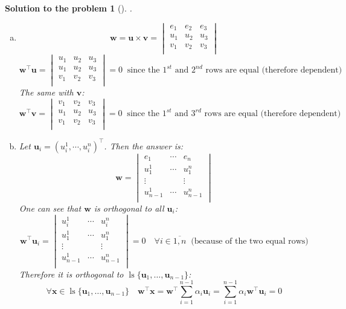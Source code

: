 \documentclass[12pt,a4]{article}
\newtheorem{solution}{Solution to the problem}
\newcommand\ls{\operatorname{ls}}
\newcommand{\ov}{\overline}
\newcommand{\bu}{{\mathbf u}}
\newcommand{\bv}{{\mathbf v}}
\newcommand{\bx}{{\mathbf x}}
\newcommand{\bw}{{\mathbf w}}
\begin{document}
\begin{solution}[]\rm .
\begin{enumerate}[(a)]
\item 
\[
\bw = \bu \times \bv =
\begin{vmatrix}
e_1 & e_2 & e_3 \\
u_1 & u_2 & u_3 \\
v_1 & v_2 & v_3 \\
\end{vmatrix}
\]
\[
\bw^\top \bu = 
\begin{vmatrix}
u_1 & u_2 & u_3 \\
u_1 & u_2 & u_3 \\
v_1 & v_2 & v_3 \\
\end{vmatrix} = 0~\text{ since the $1^{st}$ and $2^{nd}$ rows are equal (therefore dependent)}
\]
The same with $\bv$:
\[
\bw^\top \bv = 
\begin{vmatrix}
v_1 & v_2 & v_3 \\
u_1 & u_2 & u_3 \\
v_1 & v_2 & v_3 \\
\end{vmatrix} = 0~\text{ since the $1^{st}$ and $3^{rd}$ rows are equal (therefore dependent)}
\]
\item Let $\bu_i = (u_i^1, \cdots, u_i^n)^\top$. Then the answer is: 
\[
\bw = 
\begin{vmatrix}
e_1 & \cdots & e_n \\
u_1^1 & \cdots & u_1^n \\
\vdots & & \vdots \\
u_{n-1}^1 & \cdots & u_{n-1}^n \\
\end{vmatrix}
\]
One can see that $\bw$ is orthogonal to all $\bu_i$:
\[
\bw^\top \bu_i = 
\begin{vmatrix}
u_i^1 & \cdots & u_i^n \\
u_1^1 & \cdots & u_1^n \\
\vdots & & \vdots \\
u_{n-1}^1 & \cdots & u_{n-1}^n \\
\end{vmatrix} = 0
\quad \forall i \in \ov{1,n} ~\text{ (because of the two equal rows)}
\]
Therefore it is orthogonal to $\ls\{\bu_1,\dots,\bu_{n-1}\}$:
\[
\forall \bx \in \ls\{\bu_1,\dots,\bu_{n-1}\} \quad \bw^\top\bx = \bw^\top \sum_{i=1}^{n-1}\alpha_i \bu_i = \sum_{i=1}^{n-1}\alpha_i \bw^\top \bu_i = 0
\]\\
\end{enumerate}
\end{solution}
\end{document}
